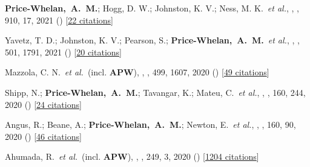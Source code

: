 {\item[{\color{deemph}\scriptsize81}]\textbf{Price-Whelan,~A.~M.}; Hogg, D. W.; Johnston, K. V.; Ness, M. K.~\textit{et al.}, , \apj, 910, 17, 2021 () [\href{http://adsabs.harvard.edu/abs/2021ApJ...910...17P}{22 citations}]

\item[{\color{deemph}\scriptsize80}]Yavetz, T. D.; Johnston, K. V.; Pearson, S.; \textbf{Price-Whelan,~A.~M.}~\textit{et al.}, , \mnras, 501, 1791, 2021 () [\href{http://adsabs.harvard.edu/abs/2021MNRAS.501.1791Y}{20 citations}]

\item[{\color{deemph}\scriptsize79}]Mazzola, C. N.~\textit{et al.}~(incl. \textbf{APW}), , \mnras, 499, 1607, 2020 () [\href{http://adsabs.harvard.edu/abs/2020MNRAS.499.1607M}{49 citations}]

\item[{\color{deemph}\scriptsize78}]Shipp, N.; \textbf{Price-Whelan,~A.~M.}; Tavangar, K.; Mateu, C.~\textit{et al.}, , \aj, 160, 244, 2020 () [\href{http://adsabs.harvard.edu/abs/2020AJ....160..244S}{24 citations}]

\item[{\color{deemph}\scriptsize77}]Angus, R.; Beane, A.; \textbf{Price-Whelan,~A.~M.}; Newton, E.~\textit{et al.}, , \aj, 160, 90, 2020 () [\href{http://adsabs.harvard.edu/abs/2020AJ....160...90A}{46 citations}]

\item[{\color{deemph}\scriptsize76}]Ahumada, R.~\textit{et al.}~(incl. \textbf{APW}), , \apjs, 249, 3, 2020 () [\href{http://adsabs.harvard.edu/abs/2020ApJS..249....3A}{1204 citations}]

}
